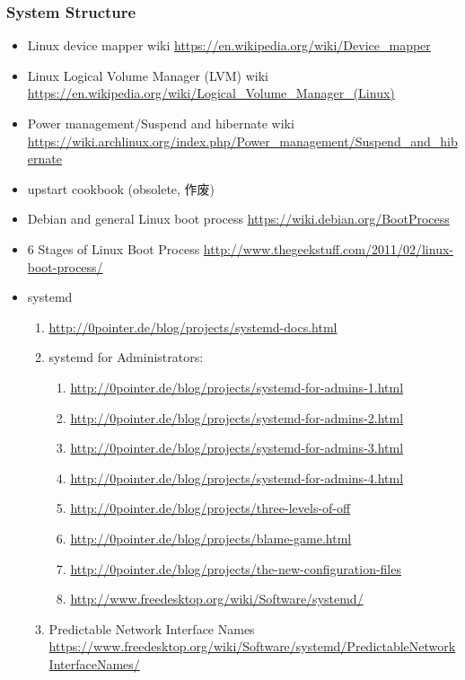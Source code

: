 \documentclass{article}
\begin{document}
\subsubsection{System Structure}
%
\begin{itemize}
    \item Linux device mapper wiki \url{https://en.wikipedia.org/wiki/Device_mapper}
    \item Linux Logical Volume Manager (LVM) wiki \url{https://en.wikipedia.org/wiki/Logical_Volume_Manager_(Linux)}
    \item Power management/Suspend and hibernate wiki \url{https://wiki.archlinux.org/index.php/Power_management/Suspend_and_hibernate}
    \item upstart cookbook (obsolete, 作废)
    \item Debian and general Linux boot process
          \url{https://wiki.debian.org/BootProcess}
    \item 6 Stages of Linux Boot Process
          \url{http://www.thegeekstuff.com/2011/02/linux-boot-process/}
    \item systemd
        \begin{enumerate}
            \item \url{http://0pointer.de/blog/projects/systemd-docs.html}
            \item systemd for Administrators:
                \begin{enumerate}
                    \item \url{http://0pointer.de/blog/projects/systemd-for-admins-1.html}
                    \item \url{http://0pointer.de/blog/projects/systemd-for-admins-2.html}
                    \item \url{http://0pointer.de/blog/projects/systemd-for-admins-3.html}
                    \item \url{http://0pointer.de/blog/projects/systemd-for-admins-4.html}
                    \item \url{http://0pointer.de/blog/projects/three-levels-of-off}
                    \item \url{http://0pointer.de/blog/projects/blame-game.html}
                    \item \url{http://0pointer.de/blog/projects/the-new-configuration-files}
                    \item \url{http://www.freedesktop.org/wiki/Software/systemd/}
                \end{enumerate}
            \item Predictable Network Interface Names \url{https://www.freedesktop.org/wiki/Software/systemd/PredictableNetworkInterfaceNames/}

\end{enumerate}
\end{itemize}
\end{document}
